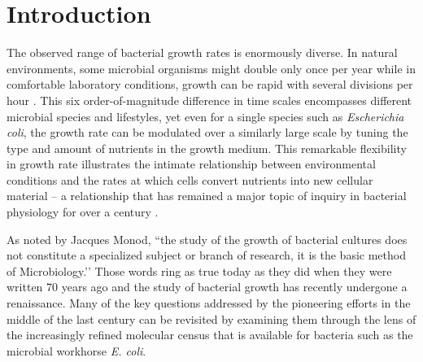 \section{Introduction}
The observed range of bacterial growth rates is enormously diverse. In
natural environments, some microbial organisms might double only once per
year \citep{mikucki2009} while in comfortable laboratory conditions, growth
can be rapid with several divisions per hour \citep{schaechter1958}. This six
order-of-magnitude difference in time scales encompasses different microbial
species and lifestyles, yet even for a single species such as \textit{Escherichia
coli}, the growth rate can be modulated over a similarly large scale by tuning the
type and amount of nutrients in the growth medium. This remarkable
flexibility in growth rate illustrates the intimate relationship between
environmental conditions and the rates at which cells convert nutrients into
new cellular material -- a relationship that has remained a major topic of
inquiry in bacterial physiology for over a century \citep{jun2018}.

As noted by Jacques Monod, ``the study of the growth of bacterial
cultures does not constitute a specialized subject or branch of research, it
is the basic method of Microbiology.’’ Those words ring as true today as they
did when they were written 70 years ago \citep{monod1949} and the study
of bacterial growth has recently undergone a renaissance. Many of the key questions
addressed by the pioneering efforts in the middle of the last century can be
revisited by examining them through the lens of the increasingly refined
molecular census that is available for bacteria such as the microbial
workhorse \textit{E. coli}.


